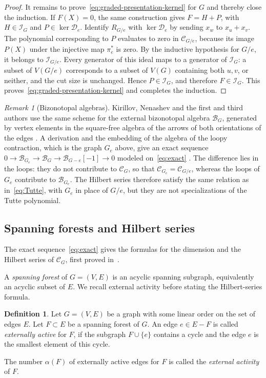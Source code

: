 \documentclass[reqno]{article}
\theoremstyle{plain} %
\theoremstyle{definition}
\newtheorem{definition}[theorem]{Definition}
\theoremstyle{remark}
\newtheorem{remark}[theorem]{\sc Remark}
\newcommand {\CC}{\mathscr{C}}
\numberwithin{equation}{section}
\begin{document}
\begin{proof}
It remains to prove~\eqref{eq:graded-presentation-kernel} for $G$ and
thereby close the induction.  If $F(X)=0$, the same construction gives
$F=H+P$, with $H\in\mathcal I_G$ and $P\in\ker\mathcal D_e$.
Identify $R_{G/e}$ with $\ker\mathcal D_e$ by sending $x_w$ to
$x_u+x_v$.  The polynomial corresponding to $P$ evaluates to zero in
$\CC_{G/e}$, because its image $P(X)$ under the injective map $\pi_e^*$
is zero.  By the inductive hypothesis for $G/e$, it belongs to
$\mathcal I_{G/e}$.
Every generator of this ideal maps to a generator of $\mathcal I_G$:
a subset of $V(G/e)$ corresponds to a subset of $V(G)$ containing both
$u,v$, or neither, and the cut size is unchanged.  Hence
$P\in\mathcal I_G$, and therefore $F\in\mathcal I_G$.
This proves~\eqref{eq:graded-presentation-kernel} and completes the
induction.
\end{proof}

\begin{remark}[Bizonotopal algebras]\label{rem:bizonotopal}
Kirillov, Nenashev and the first and third authors use the same scheme
for the external bizonotopal algebra $\mathcal B_G$, generated by vertex
elements in the square-free algebra of the arrows of both orientations
of the edges \cite{KNSV}. A derivation and the embedding of the algebra
of the loopy contraction, which is the graph $G_e$ above, give an exact
sequence
$0\to\mathcal B_{G_e}\to\mathcal B_G\to\mathcal B_{G-e}[-1]\to0$
modeled on~\eqref{eq:exact} \cite[Proposition~3.7 and
Corollary~3.8]{KNSV}. The difference lies in the loops: they do not
contribute to $\CC_G$, so that $\CC_{G_e}=\CC_{G/e}$, whereas the loops
of $G_e$ contribute to $\mathcal B_{G_e}$. The Hilbert series therefore
satisfy the same relation as in~\eqref{eq:Tutte}, with $G_e$ in place of
$G/e$, but they are not specializations of the Tutte polynomial.
\end{remark}


\subsection{Spanning forests and Hilbert series}

The exact sequence~\eqref{eq:exact} gives the formulas for the dimension and the Hilbert series of $\CC_G$, first proved in~\cite{Wa1,PSS}.

A \emph{spanning forest} of $G=(V,E)$ is an acyclic spanning subgraph,
equivalently an acyclic subset of $E$. We recall external activity
before stating the Hilbert-series formula.

\begin{definition}
Let $G=(V,E)$ be a graph with some linear order on the set of edges $E$.
Let  $F\subset E$ be a spanning forest of $G$.
An edge $e\in E-F$ is called \emph{externally active} for $F$, if the subgraph $F\cup \{e\}$ contains a cycle and the edge $e$ is the smallest element of this cycle.

The number $\alpha(F)$ of externally active edges for $F$ is called the \emph{external activity} of $F$.
\end{definition}
\end{document}
